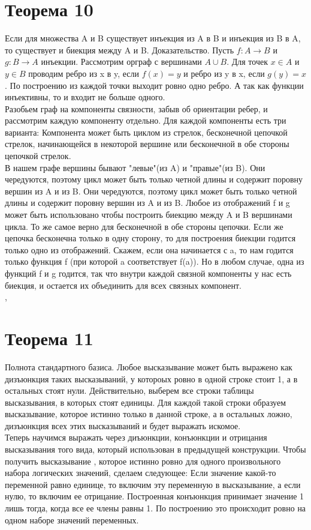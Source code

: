 \documentclass[a4paper,12pt]{article}
\begin{document}
    \section{Теорема 10}
    Если для множества A и B существует инъекция из A в B и инъекция из B в A, то
    существует и биекция между A и B.
    Доказательство. Пусть $f : A \rightarrow B$ и $g : B \rightarrow A$ инъекции.
    Рассмотрим орграф с вершинами $A \cup B$. Для точек $x \in A$ и $y \in B$ проводим
    ребро из x в y, если $f(x)=y$ и ребро из y в x, если $g(y) = x$. По построению
    из каждой точки выходит ровно одно ребро. А так как функции инъективны, то и входит
    не больше одного.\\
    Разобьем граф на компоненты связности, забыв об ориентации ребер, и рассмотрим каждую
    компоненту отдельно. Для каждой компоненты есть три варианта:
    Компонента может быть циклом из стрелок, бесконечной цепочкой стрелок, начинающейся
    в некоторой вершине или бесконечной в обе стороны цепочкой стрелок.\\
    В нашем графе вершины бывают "левые"(из A) и "правые"(из B). Они чередуются,
    поэтому цикл может быть только четной длины и содержит поровну вершин из A и из
    B. Они чередуются, поэтому цикл может быть только четной длины и содержит поровну
    вершин из A и из B. Любое из отображений f и g может быть использовано чтобы
    построить биекцию между A и B вершинами цикла. То же самое верно для бесконечной
    в обе стороны цепочки. Если же цепочка бесконечна только в одну сторону, то для
    построения биекции годится только одно из отображений. Скажем, если она начинается
    с a, то нам годится только функция f (при которой a соответствует f(a)).
    Но в любом случае, одна из функций f и g годится, так что внутри каждой связной компоненты
    у нас есть биекция, и остается их объединить для всех связных компонент.\\
    
    \sep
    \section{Теорема 11}
    Полнота стандартного базиса.
    Любое высказывание может быть выражено как дизъюнкция таких высказываний, у
    котороых ровно в одной строке стоит 1, а в остальных стоят нули. Действительно,
    выберем все строки таблицы высказывания, в которых стоят единицы. Для каждой
    такой строки образуем высказывание, которое истинно только в данной строке, а
    в остальных ложно, дизъюнкция всех этих высказываний и будет выражать искомое.\\
    Теперь научимся выражать через диъюнкции, конъюнкции и отрицания высказывания
    того вида, который использован в предыдущей конструкции. Чтобы получить высказывание
    , которое истинно ровно для одного произвольного набора логических значений, сделаем
    следующее: Если значение какой-то переменной равно единице, то включим эту переменную
    в высказывание, а если нулю, то включим ее отрицание. Построенная конъюнкция
    принимает значение 1 лишь тогда, когда все ее члены равны 1. По построению это
    происходит ровно на одном наборе значений переменных.
    
\end{document}
